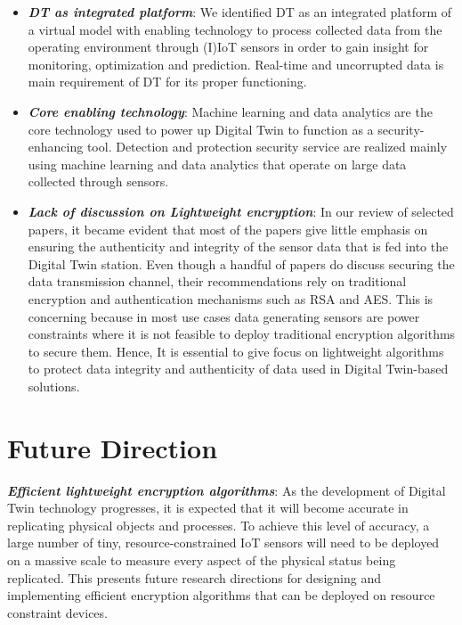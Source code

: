 \begin{itemize}
    \item \textbf{\textit{DT as integrated platform}}: We  identified DT as an integrated platform of a virtual model with enabling technology to process collected data from the operating environment through (I)IoT sensors in order to gain insight for monitoring, optimization and prediction. Real-time and uncorrupted data is main requirement of DT for its proper functioning. 


    \item\textbf{\textit{Core enabling technology}}: Machine learning and data analytics are the core technology used to power up Digital Twin to function as a security-enhancing tool. Detection and protection security service are realized mainly using machine learning and data analytics that operate on large data collected through sensors. 
    
    \item\textbf{\textit{Lack of discussion on Lightweight encryption}}: In our review of selected papers, it became evident that most of the papers give little emphasis on ensuring the authenticity and integrity of the sensor data that is fed into the Digital Twin station. Even though a handful of papers do discuss securing the data transmission channel, their recommendations rely on traditional encryption and authentication mechanisms such as RSA and AES. This is concerning because in most use cases data generating sensors are power constraints where it is not feasible to deploy traditional encryption algorithms to secure them. Hence, It is essential to give focus on lightweight algorithms to protect data integrity and authenticity of data used in Digital Twin-based solutions.
    
\end{itemize}












\section{Future Direction}

\textbf{\textit{Efficient lightweight encryption algorithms}}: As the development of Digital Twin technology progresses, it is expected that it will become accurate in replicating physical objects and processes. To achieve this level of accuracy, a large number of tiny, resource-constrained IoT sensors will need to be deployed on a massive scale to measure every aspect of the physical status being replicated. This presents future research directions for designing and implementing  efficient encryption algorithms that can be deployed on resource constraint devices.


